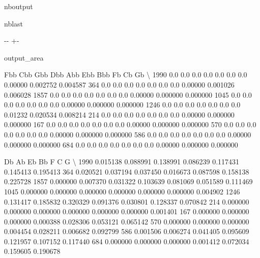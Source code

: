 \documentclass[letterpaper,10pt,english]{sphinxmanual}
\newlength\nbsphinxcodecellspacing
\begin{document}
\begin{sphinxuseclass}{nboutput}
\begin{sphinxuseclass}{nblast}
{

\kern-\sphinxverbatimsmallskipamount\kern-\baselineskip
\kern+\FrameHeightAdjust\kern-\fboxrule
\vspace{\nbsphinxcodecellspacing}

\begin{sphinxuseclass}{output_area}
\begin{sphinxuseclass}{}


\begin{sphinxVerbatim}[commandchars=\\\{\}]
\llap{\color{nbsphinxout}[22]:\,\hspace{\fboxrule}\hspace{\fboxsep}}      Fbb  Cbb  Gbb  Dbb  Abb  Ebb  Bbb       Fb        Cb        Gb  \textbackslash{}
1990  0.0  0.0  0.0  0.0  0.0  0.0  0.0  0.00000  0.002752  0.004587
364   0.0  0.0  0.0  0.0  0.0  0.0  0.0  0.00000  0.001026  0.006028
1857  0.0  0.0  0.0  0.0  0.0  0.0  0.0  0.00000  0.000000  0.000000
1045  0.0  0.0  0.0  0.0  0.0  0.0  0.0  0.00000  0.000000  0.000000
1246  0.0  0.0  0.0  0.0  0.0  0.0  0.0  0.01232  0.020534  0.008214
214   0.0  0.0  0.0  0.0  0.0  0.0  0.0  0.00000  0.000000  0.000000
167   0.0  0.0  0.0  0.0  0.0  0.0  0.0  0.00000  0.000000  0.000000
570   0.0  0.0  0.0  0.0  0.0  0.0  0.0  0.00000  0.000000  0.000000
586   0.0  0.0  0.0  0.0  0.0  0.0  0.0  0.00000  0.000000  0.000000
684   0.0  0.0  0.0  0.0  0.0  0.0  0.0  0.00000  0.000000  0.000000

            Db        Ab        Eb        Bb         F         C         G  \textbackslash{}
1990  0.015138  0.088991  0.138991  0.086239  0.117431  0.145413  0.195413
364   0.020521  0.037194  0.037450  0.016673  0.087598  0.158138  0.225728
1857  0.000000  0.007370  0.031322  0.103639  0.081069  0.051589  0.111469
1045  0.000000  0.000000  0.000000  0.000000  0.000000  0.000000  0.004902
1246  0.131417  0.185832  0.320329  0.091376  0.030801  0.128337  0.070842
214   0.000000  0.000000  0.000000  0.000000  0.000000  0.000000  0.001401
167   0.000000  0.000000  0.000000  0.000388  0.028306  0.053121  0.065142
570   0.000000  0.000000  0.000000  0.004454  0.028211  0.006682  0.092799
586   0.001506  0.006274  0.041405  0.095609  0.121957  0.107152  0.117440
684   0.000000  0.000000  0.000000  0.001412  0.072034  0.159605  0.190678


\end{sphinxVerbatim}
\end{sphinxuseclass}
\end{sphinxuseclass}}
\end{sphinxuseclass}
\end{sphinxuseclass}
\end{document}
